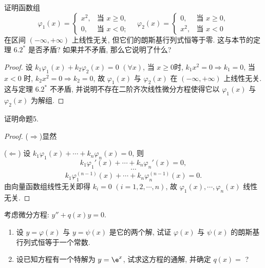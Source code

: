 \begin{exercise}
  证明函数组
  \[\varphi_1(x) =
    \begin{cases}
      x^2, & \text{当\ } x\geq 0, \\
      0,   & \text{当\ } x<0;
    \end{cases}\quad
    \varphi_2(x)=
    \begin{cases}
      0,   & \text{当\ } x\geq 0, \\
      x^2, & \text{当\ } x<0
    \end{cases}\]
  在区间 $(-\infty,+\infty)$ 上线性无关, 但它们的朗斯基行列式恒等于零. 
  这与本节的定理 $6.2^*$ 是否矛盾? 如果并不矛盾, 那么它说明了什么?
\end{exercise}

\begin{proof} 
  设 $k_1\varphi_1(x)+k_2\varphi_2(x)=0$ $(\forall x)$, 当 $x\geq 0$时, $k_1x^2=0\Rightarrow k_1=0$, 
  当 $x<0$ 时, $k_2x^2=0\Rightarrow k_2=0$, 
  故 $\varphi_1(x)$ 与 $\varphi_2(x)$ 在 $(-\infty,+\infty)$ 上线性无关. 
  这与定理 $6.2^*$ 不矛盾, 并说明不存在二阶齐次线性微分方程使得它以 $\varphi_1(x)$ 与 $\varphi_2(x)$ 为解组.
\end{proof}



\begin{exercise}
  证明命题5.
\end{exercise}

\begin{proof} 
  ($\Rightarrow$)显然

  ($\Leftarrow$) 设 $k_1\varphi_1(x)+\cdots+k_n\varphi_n(x)=0$, 则
  \[k_1\varphi_1'(x)+\cdots+k_n\varphi_n'(x)=0,\]
  \[\cdots\]
  \[k_1\varphi_1^{(n-1)}(x)+\cdots+k_n\varphi_n^{(n-1)}(x)=0.\]
  由向量函数组线性无关即得 $k_i=0$ $(i=1,2,\cdots,n)$, 故 $\varphi_1(x),\cdots,\varphi_n(x)$ 线性无关.
\end{proof}



\begin{exercise}
  考虑微分方程: $y''+q(x)y=0$.
  \begin{enumerate}[(1)]
  \item 设 $y=\varphi(x)$ 与 $y=\psi(x)$ 是它的两个解, 
    试证 $\varphi(x)$ 与 $\psi(x)$ 的朗斯基行列式恒等于一个常数.
  \item 设已知方程有一个特解为 $y=\e^x$, 试求这方程的通解, 并确定 $q(x)=$ ?
  \end{enumerate}
\end{exercise}

